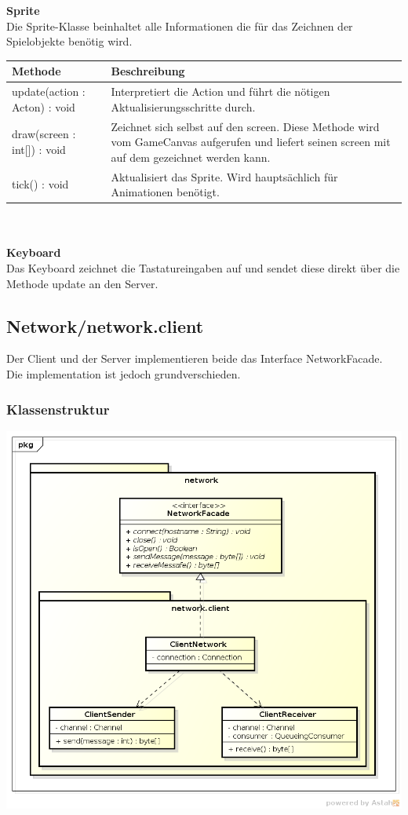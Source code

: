 \documentclass[11pt]{scrartcl}
\begin{document}
\textbf{Sprite}\\
Die Sprite-Klasse beinhaltet alle Informationen die für das Zeichnen der Spielobjekte benötig wird.\\


\begin{tabularx}{\linewidth}{l X}
\textbf{Methode} & \textbf{Beschreibung}\\
\hline
update(action : Acton) : void & Interpretiert die Action und führt die nötigen Aktualisierungsschritte durch.\\
draw(screen : int[]) : void & Zeichnet sich selbst auf den screen. Diese Methode wird vom GameCanvas aufgerufen und liefert seinen screen mit auf dem gezeichnet werden kann.\\
tick() : void & Aktualisiert das Sprite. Wird hauptsächlich für Animationen benötigt.\\
\end{tabularx}\\\\


\textbf{Keyboard}\\
Das Keyboard zeichnet die Tastatureingaben auf und sendet diese direkt über die Methode update an den Server.

\newpage

\subsection{Network/network.client}

Der Client und der Server implementieren beide das Interface NetworkFacade. Die implementation ist jedoch grundverschieden.

\subsubsection{Klassenstruktur}
\includegraphics[scale=0.5]{ClassDiagramNetworkClient}
\end{document}
